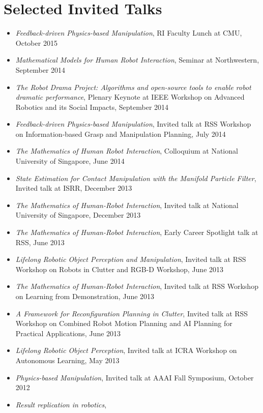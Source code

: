 
\section{Selected Invited Talks}
\begin{itemize}
\addtolength{\itemsep}{-0.5\baselineskip}
\item \textit{Feedback-driven Physics-based Manipulation},
RI Faculty Lunch at CMU, October 2015
\item \textit{Mathematical Models for Human Robot Interaction},
Seminar at Northwestern, September 2014
\item \textit{The Robot Drama Project: Algorithms and open-source tools to enable robot dramatic performance},
Plenary Keynote at IEEE Workshop on Advanced Robotics and its Social Impacts, September 2014
\item \textit{Feedback-driven Physics-based Manipulation},
Invited talk at RSS Workshop on Information-based Grasp and Manipulation Planning, July 2014
\item \textit{The Mathematics of Human Robot Interaction},
Colloquium at National University of Singapore, June 2014
\item \textit{State Estimation for Contact Manipulation with the Manifold Particle Filter},
Invited talk at ISRR, December 2013
\item \textit{The Mathematics of Human-Robot Interaction},
Invited talk at National University of Singapore, December 2013
\item \textit{The Mathematics of Human-Robot Interaction},
Early Career Spotlight talk at RSS, June 2013
\item \textit{Lifelong Robotic Object Perception and Manipulation},
Invited talk at RSS Workshop on Robots in Clutter and RGB-D Workshop, June 2013
\item \textit{The Mathematics of Human-Robot Interaction},
Invited talk at RSS Workshop on Learning from Demonstration, June 2013
\item \textit{A Framework for Reconfiguration Planning in Clutter},
Invited talk at RSS Workshop on Combined Robot Motion Planning and AI Planning for Practical Applications, June 2013
\item \textit{Lifelong Robotic Object Perception},
Invited talk at ICRA Workshop on Autonomous Learning, May 2013
\item \textit{Physics-based Manipulation},
Invited talk at AAAI Fall Symposium, October 2012
\item \textit{Result replication in robotics},

\end{itemize}
